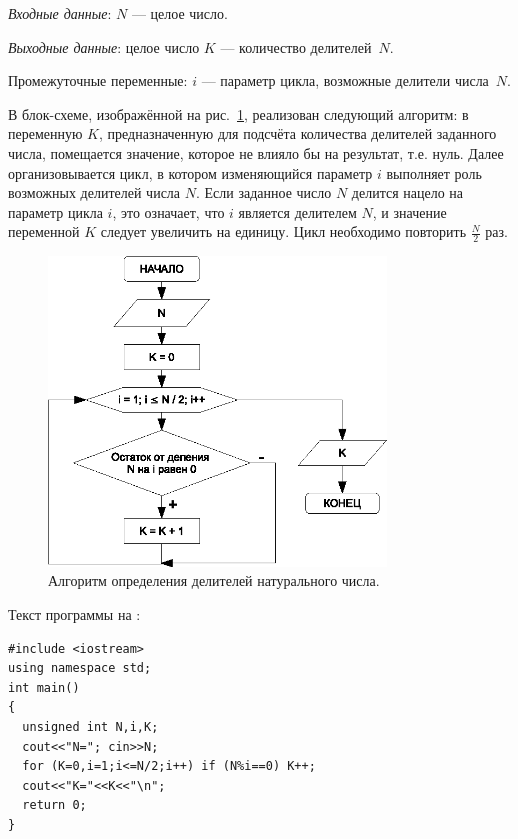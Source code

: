 
\emph{Входные данные}: $N$ --- целое число.

\emph{Выходные данные}: целое число $K$ --- количество делителей~$N$.

Промежуточные переменные: $i$ --- параметр цикла, возможные делители числа~$N$.

В блок-схеме, изображённой на рис.~\ref{ch03:refDrawing30}, реализован следующий алгоритм: в переменную $K$,
предназначенную для подсчёта количества делителей заданного числа, помещается значение, которое не влияло бы на
результат, т.е. нуль. Далее организовывается цикл, в котором изменяющийся параметр $i$ выполняет роль
возможных делителей числа $N$. Если заданное число $N$ делится нацело на параметр цикла $i$, это
означает, что $i$ является делителем $N$, и значение переменной $K$
следует увеличить на единицу. Цикл необходимо повторить $\frac{N}{2}$ раз.

\begin{figure}[htb]
\begin{center}
\includegraphics[width=0.8\textwidth]{img/ris_3_31}
\caption{Алгоритм определения делителей натурального числа.}
\label{ch03:refDrawing30}
\end{center}
\end{figure}

Текст программы на :
\begin{lstlisting}
#include <iostream>
using namespace std;
int main()
{
  unsigned int N,i,K;
  cout<<"N="; cin>>N;
  for (K=0,i=1;i<=N/2;i++) if (N%i==0) K++;
  cout<<"K="<<K<<"\n";
  return 0;
}
\end{lstlisting}

